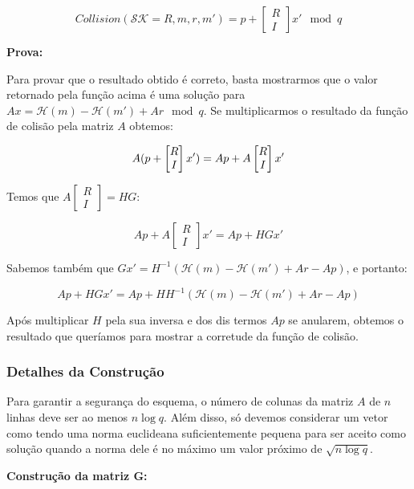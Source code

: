 \documentclass[a4paper]{article}
\begin{document}
$$ Collision(\mathcal{SK}=R, m, r, m') = p +
\left[\begin{matrix}R\\I\end{matrix}\right]x' \mod q
$$

\textbf{Prova:}

Para provar que o resultado obtido é correto, basta mostrarmos que o
valor retornado pela função acima é uma solução para $Ax =
\mathcal{H}(m) - \mathcal{H}(m') + Ar \mod q$. Se multiplicarmos o
resultado da função de colisão pela matriz $A$ obtemos:

$$ A(p+\left[\begin{matrix}R\\I\end{matrix}\right]x') = Ap +
A\left[\begin{matrix}R\\I\end{matrix}\right]x'\\
$$

Temos que $A\left[\begin{matrix}R\\I\end{matrix}\right] = HG$:

$$
Ap + A\left[\begin{matrix}R\\I\end{matrix}\right]x' = Ap + HGx'
$$

Sabemos também que $Gx' = H^{-1}(\mathcal{H}(m) - \mathcal{H}(m') + Ar
- Ap)$, e portanto:

$$
Ap + HGx' = Ap + H H^{-1}(\mathcal{H}(m) - \mathcal{H}(m') + Ar - Ap)
$$

Após multiplicar $H$ pela sua inversa e dos dis termos $Ap$ se
anularem, obtemos o resultado que queríamos para mostrar a corretude
da função de colisão.

\subsubsection{Detalhes da Construção}

Para garantir a segurança do esquema, o número de colunas da matriz
$A$ de $n$ linhas deve ser ao menos $n\log q$. Além disso, só devemos
considerar um vetor como tendo uma norma euclideana suficientemente
pequena para ser aceito como solução quando a norma dele é no máximo
um valor próximo de $\sqrt{n \log q}$.

\textbf{Construção da matriz G:}
\end{document}

